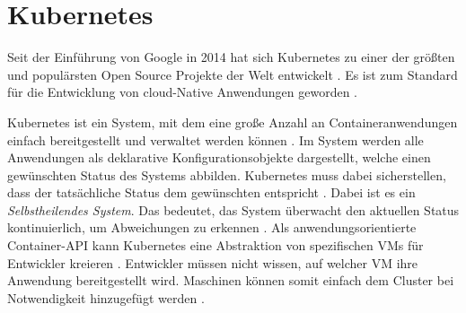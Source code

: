 \section{Kubernetes}
\label{sec:grundlagen:kubernetes}
Seit der Einführung von Google in 2014 hat sich Kubernetes zu einer der größten und populärsten 
Open Source Projekte der Welt entwickelt \cite{Burns2019}. Es ist zum Standard für die Entwicklung von cloud-Native 
Anwendungen geworden \cite{Burns2019}. 

Kubernetes ist ein System, mit dem eine große Anzahl an Containeranwendungen einfach bereitgestellt und verwaltet werden können \cite{Marko2018}.
Im System werden alle Anwendungen als deklarative Konfigurationsobjekte dargestellt, welche einen gewünschten
Status des Systems abbilden. Kubernetes muss dabei sicherstellen, dass der tatsächliche Status dem gewünschten entspricht \cite{Burns2019}.
Dabei ist es ein \emph{Selbstheilendes System}.
Das bedeutet, das System überwacht den aktuellen Status kontinuierlich, um Abweichungen zu erkennen \cite{Burns2019}.
Als anwendungsorientierte Container-API kann Kubernetes eine Abstraktion von spezifischen \acp{VM} für Entwickler kreieren \cite{Burns2019}.
Entwickler müssen nicht wissen, auf welcher \ac{VM} ihre Anwendung bereitgestellt wird.
Maschinen können somit einfach dem Cluster bei Notwendigkeit hinzugefügt werden \cite{Burns2019}.